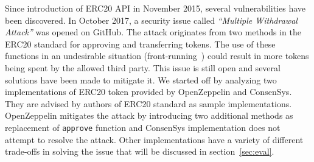 

Since introduction of ERC20 API in November 2015, several vulnerabilities have been discovered. In October 2017, a security issue called \textit{``Multiple Withdrawal Attack''} was opened on GitHub\cite{Ref13,Ref07}. The attack originates from two methods in the ERC20 standard for approving and transferring tokens. The use of these functions in an undesirable situation (\eg front-running~\cite{eskandari2019sok}) could result in more tokens being spent by the allowed third party. This issue is still open and several solutions have been made to mitigate it. We started off by analyzing two implementations of ERC20 token provided by OpenZeppelin\cite{Ref10} and ConsenSys\cite{Ref11}. They are advised by authors of ERC20 standard \cite{Ref08} as sample implementations. OpenZeppelin mitigates the attack by introducing two additional methods as replacement of \texttt{approve} function and ConsenSys implementation does not attempt to resolve the attack. Other implementations have a variety of different trade-offs in solving the issue that will be discussed in section~\ref{sec:eval}.


